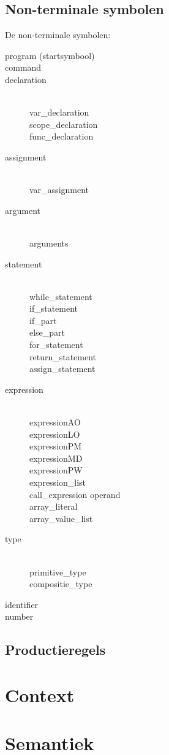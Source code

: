 \subsection{Non-terminale symbolen}
De non-terminale symbolen:
\begin{description}
    \item[program (startsymbool)] 
    \item[command]
    \item[declaration] \hfill \\
        var\_declaration \\
        scope\_declaration \\
        func\_declaration
    \item[assignment] \hfill \\
        var\_assignment
    \item[argument] \hfill \\
        arguments
    \item[statement] \hfill \\
        while\_statement \\
        if\_statement \\ 
        if\_part \\
        else\_part \\
        for\_statement \\
        return\_statement \\
        assign\_statement
    \item[expression] \hfill \\
        expressionAO \\
        expressionLO \\
        expressionPM \\
        expressionMD \\
        expressionPW \\
        expression\_list \\
        call\_expression
        operand \\
        array\_literal \\
        array\_value\_list
    \item[type] \hfill \\
        primitive\_type \\
        compositie\_type
    \item[identifier]
    \item[number]
\end{description}

\subsection{Productieregels}

\section{Context}

\section{Semantiek}

\clearpage